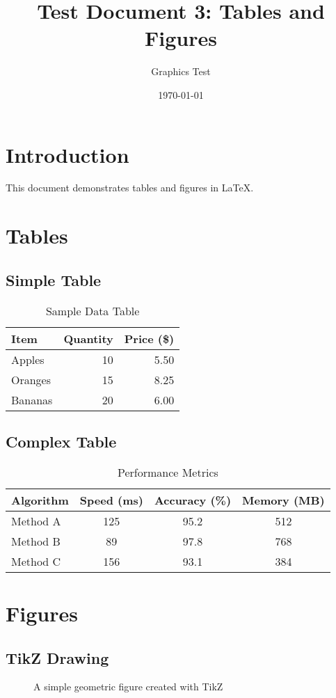 \documentclass[11pt]{article}
\title{Test Document 3: Tables and Figures}
\author{Graphics Test}
\date{\today}
\begin{document}
\maketitle

\section{Introduction}
This document demonstrates tables and figures in LaTeX.

\section{Tables}

\subsection{Simple Table}
\begin{table}[h]
\centering
\caption{Sample Data Table}
\begin{tabular}{@{}lrr@{}}
\toprule
Item & Quantity & Price (\$) \\
\midrule
Apples & 10 & 5.50 \\
Oranges & 15 & 8.25 \\
Bananas & 20 & 6.00 \\
\bottomrule
\end{tabular}
\end{table}

\subsection{Complex Table}
\begin{table}[h]
\centering
\caption{Performance Metrics}
\begin{tabular}{|l|c|c|c|}
\hline
\textbf{Algorithm} & \textbf{Speed (ms)} & \textbf{Accuracy (\%)} & \textbf{Memory (MB)} \\
\hline
Method A & 125 & 95.2 & 512 \\
\hline
Method B & 89 & 97.8 & 768 \\
\hline
Method C & 156 & 93.1 & 384 \\
\hline
\end{tabular}
\end{table}

\section{Figures}

\subsection{TikZ Drawing}
\begin{figure}[h]
\centering
{}
\caption{A simple geometric figure created with TikZ}
\end{figure}
\end{document}
